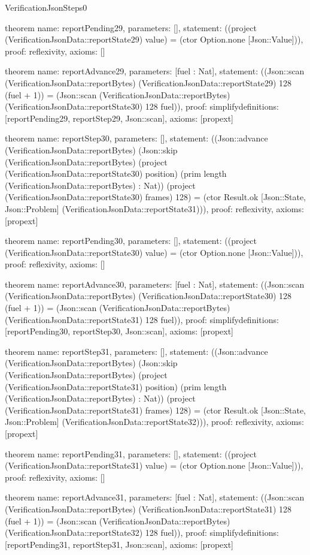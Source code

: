 \begin{lexlean}{VerificationJsonSteps0}
\begin{semanticmodule}
theorem{
  name: reportPending29,
  parameters: [],
  statement: ((project (VerificationJsonData::reportState29) value) = (ctor Option.none [Json::Value])),
  proof: reflexivity{},
  axioms: []
}

theorem{
  name: reportAdvance29,
  parameters: [fuel : Nat],
  statement: ((Json::scan (VerificationJsonData::reportBytes) (VerificationJsonData::reportState29) 128 (fuel + 1)) = (Json::scan (VerificationJsonData::reportBytes) (VerificationJsonData::reportState30) 128 fuel)),
  proof: simplify{definitions: [reportPending29, reportStep29, Json::scan]},
  axioms: [propext]
}

theorem{
  name: reportStep30,
  parameters: [],
  statement: ((Json::advance (VerificationJsonData::reportBytes) (Json::skip (VerificationJsonData::reportBytes) (project (VerificationJsonData::reportState30) position) (prim length (VerificationJsonData::reportBytes) : Nat)) (project (VerificationJsonData::reportState30) frames) 128) = (ctor Result.ok [Json::State, Json::Problem] (VerificationJsonData::reportState31))),
  proof: reflexivity{},
  axioms: [propext]
}

theorem{
  name: reportPending30,
  parameters: [],
  statement: ((project (VerificationJsonData::reportState30) value) = (ctor Option.none [Json::Value])),
  proof: reflexivity{},
  axioms: []
}

theorem{
  name: reportAdvance30,
  parameters: [fuel : Nat],
  statement: ((Json::scan (VerificationJsonData::reportBytes) (VerificationJsonData::reportState30) 128 (fuel + 1)) = (Json::scan (VerificationJsonData::reportBytes) (VerificationJsonData::reportState31) 128 fuel)),
  proof: simplify{definitions: [reportPending30, reportStep30, Json::scan]},
  axioms: [propext]
}

theorem{
  name: reportStep31,
  parameters: [],
  statement: ((Json::advance (VerificationJsonData::reportBytes) (Json::skip (VerificationJsonData::reportBytes) (project (VerificationJsonData::reportState31) position) (prim length (VerificationJsonData::reportBytes) : Nat)) (project (VerificationJsonData::reportState31) frames) 128) = (ctor Result.ok [Json::State, Json::Problem] (VerificationJsonData::reportState32))),
  proof: reflexivity{},
  axioms: [propext]
}

theorem{
  name: reportPending31,
  parameters: [],
  statement: ((project (VerificationJsonData::reportState31) value) = (ctor Option.none [Json::Value])),
  proof: reflexivity{},
  axioms: []
}

theorem{
  name: reportAdvance31,
  parameters: [fuel : Nat],
  statement: ((Json::scan (VerificationJsonData::reportBytes) (VerificationJsonData::reportState31) 128 (fuel + 1)) = (Json::scan (VerificationJsonData::reportBytes) (VerificationJsonData::reportState32) 128 fuel)),
  proof: simplify{definitions: [reportPending31, reportStep31, Json::scan]},
  axioms: [propext]
}


\end{semanticmodule}
\end{lexlean}
